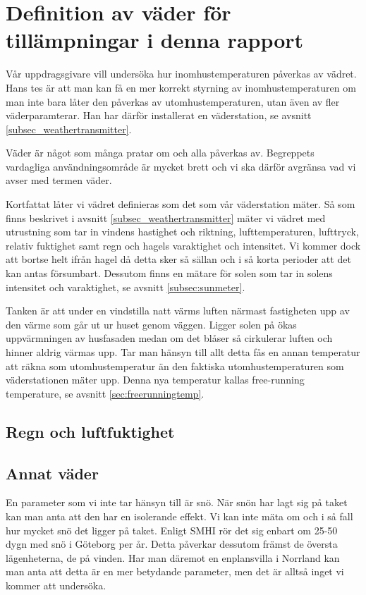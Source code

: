 \section{Definition av väder för tillämpningar i denna rapport}
\label{subsec_weather}
Vår uppdragsgivare vill undersöka hur inomhustemperaturen påverkas av vädret. Hans tes är att man kan få en mer korrekt styrning av inomhustemperaturen om man inte bara låter den påverkas av utomhustemperaturen, utan även av fler väderparamterar. Han har därför installerat en väderstation, se avsnitt \ref{subsec_weathertransmitter}.

Väder är något som många pratar om och alla påverkas av. Begreppets vardagliga användningsområde är mycket brett och vi ska därför avgränsa vad vi avser med termen väder. 

Kortfattat låter vi vädret definieras som det som vår väderstation mäter. Så som finns beskrivet i avsnitt \ref{subsec_weathertransmitter} mäter vi vädret med utrustning som tar in vindens hastighet och riktning, lufttemperaturen, lufttryck, relativ fuktighet samt regn och hagels varaktighet och intensitet. Vi kommer dock att bortse helt ifrån hagel då detta sker så sällan och i så korta perioder att det kan antas försumbart.  Dessutom finns en mätare för solen som tar in solens intensitet och varaktighet, se avsnitt \ref{subsec:sunmeter}. %

Tanken är att under en vindstilla natt värms luften närmast fastigheten upp av den värme som går ut ur huset genom väggen. Ligger solen på ökas uppvärmningen av husfasaden medan om det blåser så cirkulerar luften och hinner aldrig värmas upp. Tar man hänsyn till allt detta fås en annan temperatur att räkna som utomhustemperatur än den faktiska utomhustemperaturen som väderstationen mäter upp. Denna nya temperatur kallas free-running temperature, se avsnitt \ref{sec:freerunningtemp}. %

\subsection{Regn och luftfuktighet}

\subsection{Annat väder}
En parameter som vi inte tar hänsyn till är snö. När snön har lagt sig på taket kan man anta att den har en isolerande effekt. Vi kan inte mäta om och i så fall hur mycket snö det ligger på taket. Enligt SMHI %
rör det sig enbart om 25-50 dygn med snö i Göteborg per år. Detta påverkar dessutom främst de översta lägenheterna, de på vinden. Har man däremot en enplansvilla i Norrland kan man anta att detta är en mer betydande parameter, men det är alltså inget vi kommer att undersöka.

